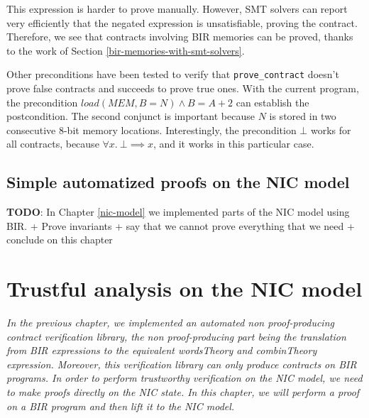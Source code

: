 \documentclass{kththesis}
\begin{document}
This expression is harder to prove manually. However, SMT solvers can report very efficiently that the negated expression is unsatisfiable, proving the contract. Therefore, we see that contracts involving BIR memories can be proved, thanks to the work of Section \ref{bir-memories-with-smt-solvers}.

Other preconditions have been tested to verify that \texttt{prove\_contract} doesn't prove false contracts and succeeds to prove true ones. With the current program, the precondition $load(MEM,B=N) \land B=A+2$ can establish the postcondition. The second conjunct is important because $N$ is stored in two consecutive 8-bit memory locations. Interestingly, the precondition $\bot$ works for all contracts, because $\forall x.~\bot \implies x$, and it works in this particular case.


\section{Simple automatized proofs on the NIC model}

\textbf{TODO}: In Chapter \ref{nic-model} we implemented parts of the NIC model using BIR.
+ Prove invariants
+ say that we cannot prove everything that we need
+ conclude on this chapter

\chapter{Trustful analysis on the NIC model} \label{trustful-nic-analysis}
\vspace{-1cm}
\textit{In the previous chapter, we implemented an automated non \gls{proof-producing} contract verification library, the non proof-producing part being the translation from BIR expressions to the equivalent \textit{wordsTheory} and \textit{combinTheory} expression. Moreover, this verification library can only produce contracts on BIR programs. In order to perform trustworthy verification on the \gls{NIC} model, we need to make proofs directly on the \gls{NIC} state. In this chapter, we will perform a proof on a BIR program and then lift it to the \gls{NIC} model.}

\end{document}
